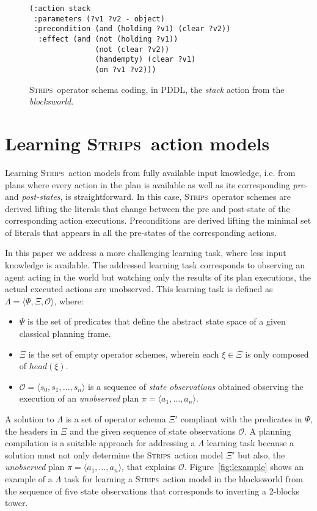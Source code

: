 \documentclass{article}
\newcommand{\tup}[1]{{\langle #1 \rangle}}
\newcommand{\strips}{\textsc{Strips}}     %
\begin{document}
\begin{figure}
\begin{footnotesize}
\begin{verbatim}
(:action stack
 :parameters (?v1 ?v2 - object)
 :precondition (and (holding ?v1) (clear ?v2))
  :effect (and (not (holding ?v1))
               (not (clear ?v2))
               (handempty) (clear ?v1)
               (on ?v1 ?v2)))
\end{verbatim}
\end{footnotesize}
 \caption{\small \strips\ operator schema coding, in PDDL, the {\em stack} action from the {\em blocksworld}.}
\label{fig:stack}
\end{figure}


\section{Learning \strips\ action models}
Learning \strips\ action models from fully available input knowledge, i.e. from plans where every action in the plan is available as well as its corresponding {\em pre-} and {\em post-states}, is straightforward. In this case, \strips\ operator schemes are derived lifting the literals that change between the pre and post-state of the corresponding action executions. Preconditions are derived lifting the minimal set of literals that appears in all the pre-states of the corresponding actions.

In this paper we address a more challenging learning task, where less input knowledge is available. The addressed learning task corresponds to observing an agent acting in the world but watching only the results of its plan executions, the actual executed actions are unobserved. This learning task is defined as $\Lambda=\tup{\Psi,\Xi,\mathcal{O}}$, where:
\begin{itemize}
\item $\Psi$ is the set of predicates that define the abstract state space of a given classical planning frame.
\item $\Xi$ is the set of empty operator schemes, wherein each $\xi\in\Xi$ is only composed of $head(\xi)$.
\item $\mathcal{O}=\tup{s_0,s_1,\ldots,s_{n}}$ is a sequence of {\em state observations} obtained observing the execution of an {\em unobserved} plan $\pi=\tup{a_1, \ldots, a_n}$.
\end{itemize}

A solution to $\Lambda$ is a set of operator schema $\Xi'$ compliant with the predicates in $\Psi$, the headers in $\Xi$ and the given sequence of state observations $\mathcal{O}$. A planning compilation is a suitable approach for addressing a $\Lambda$ learning task because a solution must not only determine the \strips\ action model $\Xi'$ but also, the {\em unobserved} plan $\pi=\tup{a_1, \ldots, a_n}$, that explains $\mathcal{O}$. Figure~\ref{fig:lexample} shows an example of a $\Lambda$ task for learning a \strips\ action model in the blocksworld from the sequence of five state observations that corresponds to inverting a 2-blocks tower.
\end{document}
